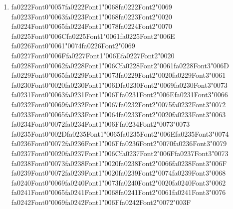 \documentclass[12pt]{article}
\begin{document}
\begin{enumerate}[label=Q\arabic*.]
 \item {\csname fa0222Font0\endcsname\char"0057}{\csname fa0222Font1\endcsname\char"0068}{\csname fa0222Font2\endcsname\char"0069} {\csname fa0223Font0\endcsname\char"0063}{\csname fa0223Font1\endcsname\char"0068}{\csname fa0223Font2\endcsname\char"0020} {\csname fa0224Font0\endcsname\char"0065}{\csname fa0224Font1\endcsname\char"0078}{\csname fa0224Font2\endcsname\char"0070} {\csname fa0225Font0\endcsname\char"006C}{\csname fa0225Font1\endcsname\char"0061}{\csname fa0225Font2\endcsname\char"006E} {\csname fa0226Font0\endcsname\char"0061}{\char"0074}{\csname fa0226Font2\endcsname\char"0069} {\csname fa0227Font0\endcsname\char"006F}{\csname fa0227Font1\endcsname\char"006E}{\csname fa0227Font2\endcsname\char"0020} {\csname fa0228Font0\endcsname\char"0062}{\csname fa0228Font1\endcsname\char"006C}{\csname fa0228Font2\endcsname\char"0061}{\csname fa0228Font3\endcsname\char"006D} {\csname fa0229Font0\endcsname\char"0065}{\csname fa0229Font1\endcsname\char"0073}{\csname fa0229Font2\endcsname\char"0020}{\csname fa0229Font3\endcsname\char"0061} {\csname fa0230Font0\endcsname\char"0020}{\csname fa0230Font1\endcsname\char"006D}{\csname fa0230Font2\endcsname\char"0069}{\csname fa0230Font3\endcsname\char"0073} {\csname fa0231Font0\endcsname\char"0063}{\csname fa0231Font1\endcsname\char"006F}{\csname fa0231Font2\endcsname\char"006E}{\csname fa0231Font3\endcsname\char"0066} {\csname fa0232Font0\endcsname\char"0069}{\csname fa0232Font1\endcsname\char"0067}{\csname fa0232Font2\endcsname\char"0075}{\csname fa0232Font3\endcsname\char"0072} {\csname fa0233Font0\endcsname\char"0065}{\csname fa0233Font1\endcsname\char"0064}{\csname fa0233Font2\endcsname\char"0020}{\csname fa0233Font3\endcsname\char"0063} {\csname fa0234Font0\endcsname\char"0072}{\csname fa0234Font1\endcsname\char"006F}{\csname fa0234Font2\endcsname\char"0073}{\char"0073} {\csname fa0235Font0\endcsname\char"002D}{\csname fa0235Font1\endcsname\char"0065}{\csname fa0235Font2\endcsname\char"006E}{\csname fa0235Font3\endcsname\char"0074} {\csname fa0236Font0\endcsname\char"0072}{\csname fa0236Font1\endcsname\char"006F}{\csname fa0236Font2\endcsname\char"0070}{\csname fa0236Font3\endcsname\char"0079} {\csname fa0237Font0\endcsname\char"0020}{\csname fa0237Font1\endcsname\char"006C}{\csname fa0237Font2\endcsname\char"006F}{\csname fa0237Font3\endcsname\char"0073} {\csname fa0238Font0\endcsname\char"0073}{\csname fa0238Font1\endcsname\char"0020}{\csname fa0238Font2\endcsname\char"0066}{\csname fa0238Font3\endcsname\char"006F} {\csname fa0239Font0\endcsname\char"0072}{\csname fa0239Font1\endcsname\char"0020}{\csname fa0239Font2\endcsname\char"0074}{\csname fa0239Font3\endcsname\char"0068} {\csname fa0240Font0\endcsname\char"0069}{\csname fa0240Font1\endcsname\char"0073}{\csname fa0240Font2\endcsname\char"0020}{\csname fa0240Font3\endcsname\char"0062} {\csname fa0241Font0\endcsname\char"0065}{\csname fa0241Font1\endcsname\char"0068}{\csname fa0241Font2\endcsname\char"0061}{\csname fa0241Font3\endcsname\char"0076} {\csname fa0242Font0\endcsname\char"0069}{\csname fa0242Font1\endcsname\char"006F}{\csname fa0242Font2\endcsname\char"0072}{\char"003F}

\end{enumerate}
\end{document}
